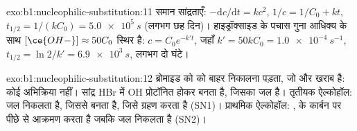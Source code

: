 \begin{solution}{exo:b1:nucleophilic-substitution:11}
समान सांद्रताएँ: $-\mathrm{d}c/\mathrm{d}t = kc^2$, $1/c = 1/C_0 + kt$,
$t_{1/2} = 1/(kC_0) = \qty{5.0e5}{s}$ (लगभग छह दिन)। हाइड्रॉक्साइड के पचास गुना
आधिक्य के साथ $[\ce{OH-}] \approx 50C_0$ स्थिर है: $c = C_0
e^{-k't}$, जहाँ $k' = 50kC_0 = \qty{1.0e-4}{s^{-1}}$, $t_{1/2} = \ln 2/k' =
\qty{6.9e3}{s}$, लगभग दो घंटे।
\end{solution}

\begin{solution}{exo:b1:nucleophilic-substitution:12}
ब्रोमाइड को  को बाहर निकालना पड़ता, जो  और खराब  है: कोई अभिक्रिया नहीं। सांद्र HBr में OH प्रोटॉनित होकर
 बनता है, जिसका  जल है। तृतीयक ऐल्कोहॉल: जल निकलता है,
जिससे  बनता है, जिसे  ग्रहण करता है (SN1)। प्राथमिक ऐल्कोहॉल:
,  के कार्बन पर पीछे से आक्रमण करता है जबकि जल निकलता है
(SN2)।
\end{solution}

